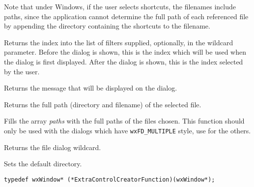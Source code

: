 Note that under Windows, if the user selects shortcuts, the filenames
include paths, since the application cannot determine the full path
of each referenced file by appending the directory containing the shortcuts
to the filename.

\label{wxfiledialoggetfilterindex}


Returns the index into the list of filters supplied, optionally, in the wildcard parameter.
Before the dialog is shown, this is the index which will be used when the dialog is first displayed.
After the dialog is shown, this is the index selected by the user.

\label{wxfiledialoggetmessage}


Returns the message that will be displayed on the dialog.

\label{wxfiledialoggetpath}


Returns the full path (directory and filename) of the selected file.

\label{wxfiledialoggetpaths}


Fills the array {\it paths} with the full paths of the files chosen. This
function should only be used with the dialogs which have {\tt wxFD\_MULTIPLE} style,
use  for the others.

\label{wxfiledialoggetwildcard}


Returns the file dialog wildcard.

\label{wxfiledialogsetdirectory}


Sets the default directory.

\label{wxfiledialogsetextracontrolcreator}

\begin{verbatim}
typedef wxWindow* (*ExtraControlCreatorFunction)(wxWindow*);
\end{verbatim}

